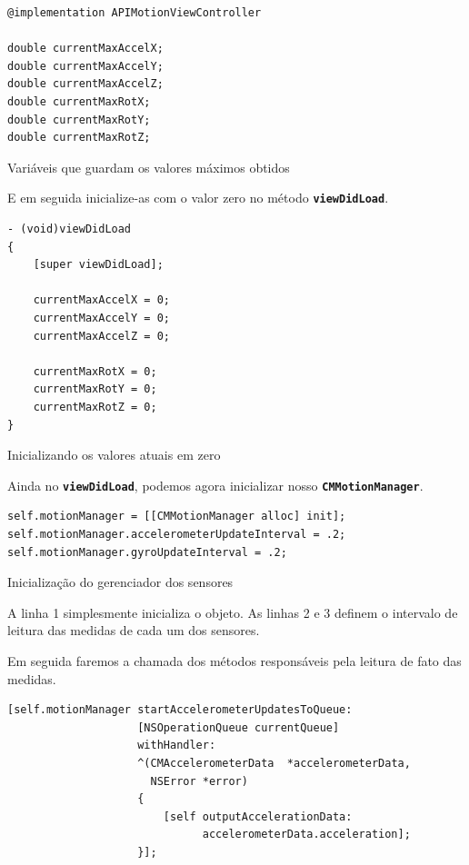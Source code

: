 \documentclass[a4paper,12pt,brazil,doubleside]{book}
\begin{document}
\begin{singlespace}
\begin{listing}[H]
\begin{verbatim}
@implementation APIMotionViewController

double currentMaxAccelX;
double currentMaxAccelY;
double currentMaxAccelZ;
double currentMaxRotX;
double currentMaxRotY;
double currentMaxRotZ;
\end{verbatim}
\caption{Variáveis que guardam os valores máximos obtidos}
\end{listing}


E em seguida inicialize-as com o valor zero no método \texttt{\textbf{viewDidLoad}}.

\begin{listing}[H]
\begin{verbatim}
- (void)viewDidLoad
{
    [super viewDidLoad];
    
    currentMaxAccelX = 0;
    currentMaxAccelY = 0;
    currentMaxAccelZ = 0;
    
    currentMaxRotX = 0;
    currentMaxRotY = 0;
    currentMaxRotZ = 0;
}
\end{verbatim}
\caption{Inicializando os valores atuais em zero}
\end{listing}


Ainda no \texttt{\textbf{viewDidLoad}}, podemos agora inicializar nosso \texttt{\textbf{CMMotionManager}}.

\begin{listing}[H]
\begin{verbatim}
self.motionManager = [[CMMotionManager alloc] init];
self.motionManager.accelerometerUpdateInterval = .2;
self.motionManager.gyroUpdateInterval = .2;
\end{verbatim}
\caption{Inicialização do gerenciador dos sensores}
\end{listing}


A linha 1 simplesmente inicializa o objeto. As linhas 2 e 3 definem o intervalo de leitura das medidas de cada um dos sensores.

Em seguida faremos a chamada dos métodos responsáveis pela leitura de fato das medidas.

\begin{listing}[H]
\begin{verbatim}
[self.motionManager startAccelerometerUpdatesToQueue:
                    [NSOperationQueue currentQueue]
                    withHandler:
                    ^(CMAccelerometerData  *accelerometerData,
                      NSError *error)
                    {
                    	[self outputAccelerationData:
                    	      accelerometerData.acceleration];
                    }];
    

\end{verbatim}
\end{listing}
\end{singlespace}
\end{document}
